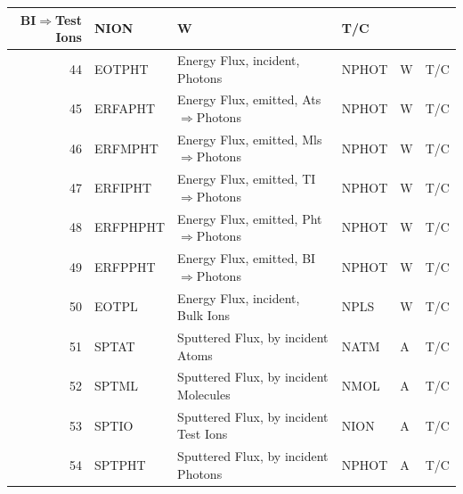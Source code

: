 \begin{landscape}
\begin{longtable}{|r|l|l|l|l|c|}
    \ac{BI}$\Rightarrow$Test Ions   & NION                   & \si{\watt}                    & T/C
    \\
    \hline
    44                       & EOTPHT                 & Energy Flux, incident,
    Photons                  & NPHOT
                             & \si{\watt}             & T/C
    \\   \hline
    45                       & ERFAPHT                & Energy Flux, emitted,
    \ac{Ats}$\Rightarrow$Photons     & NPHOT                  & \si{\watt}                    & T/C
    \\
    \hline
    46                       & ERFMPHT                & Energy Flux, emitted,
    \ac{Mls}$\Rightarrow$Photons     & NPHOT                  & \si{\watt}                    & T/C
    \\
    \hline
    47                       & ERFIPHT                & Energy Flux, emitted,
    \ac{TI}$\Rightarrow$Photons     & NPHOT                  & \si{\watt}                    & T/C
    \\
    \hline
    48                       & ERFPHPHT               & Energy Flux, emitted,
    \ac{Pht}$\Rightarrow$Photons     & NPHOT                  & \si{\watt}                    & T/C
    \\
    \hline
    49                       & ERFPPHT                & Energy Flux, emitted,
    \ac{BI}$\Rightarrow$Photons     & NPHOT                  & \si{\watt}                    & T/C
    \\
    \hline
    50                       & EOTPL                  & Energy Flux, incident,
    Bulk Ions                & NPLS
                             & \si{\watt}             & T/C
    \\   \hline\hline
    51                       & SPTAT                  & Sputtered Flux, by
    incident Atoms           & NATM
                             & \si{\ampere}           & T/C
    \\ \hline
    52                       & SPTML                  & Sputtered Flux, by
    incident Molecules       & NMOL
                             & \si{\ampere}           & T/C
    \\  \hline
    53                       & SPTIO                  & Sputtered Flux, by
    incident Test Ions       & NION
                             & \si{\ampere}           & T/C
    \\    \hline
    54                       & SPTPHT                 & Sputtered Flux, by
    incident Photons         & NPHOT
                             & \si{\ampere}           & T/C

\end{longtable}
\end{landscape}
